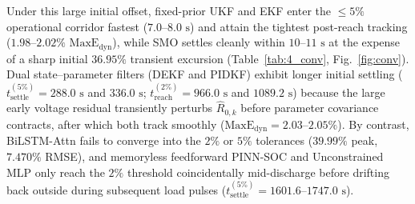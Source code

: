 \documentclass[11pt,a4paper]{article}
\begin{document}
Under this large initial offset, fixed-prior UKF and EKF enter the $\le 5\%$ operational corridor fastest ($7.0\text{--}8.0\text{ s}$) and attain the tightest post-reach tracking ($1.98\text{--}2.02\%$ $\text{MaxE}_{\text{dyn}}$), while SMO settles cleanly within $10\text{--}11\text{ s}$ at the expense of a sharp initial $36.95\%$ transient excursion (Table~\ref{tab:4_conv}, Fig.~\ref{fig:conv}). Dual state--parameter filters (DEKF and PIDKF) exhibit longer initial settling ($t_{\text{settle}}^{(5\%)} = 288.0\text{ s}$ and $336.0\text{ s}$; $t_{\text{reach}}^{(2\%)} = 966.0\text{ s}$ and $1089.2\text{ s}$) because the large early voltage residual transiently perturbs $\hat{R}_{0,k}$ before parameter covariance contracts, after which both track smoothly ($\text{MaxE}_{\text{dyn}} = 2.03\text{--}2.05\%$). By contrast, BiLSTM-Attn fails to converge into the $2\%$ or $5\%$ tolerances ($39.99\%$ peak, $7.470\%$ RMSE), and memoryless feedforward PINN-SOC and Unconstrained MLP only reach the $2\%$ threshold coincidentally mid-discharge before drifting back outside during subsequent load pulses ($t_{\text{settle}}^{(5\%)} = 1601.6\text{--}1747.0\text{ s}$).

\begin{table}[htbp]
\caption{Convergence metrics under initial state uncertainty on unseen UDDS [Tier~2 Calibrated Co-Simulation, $25^\circ\text{C}$, $100\%$ SOH] ($\Delta\text{SOC}_0 = -40\%$ initial error; $5$-seed mean for neural models).\label{tab:4_conv}}
%
\end{table}
\end{document}
